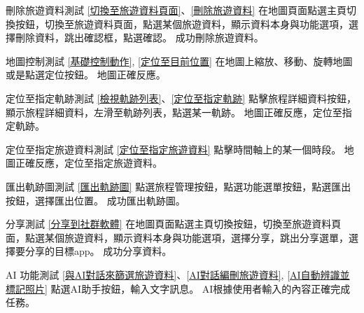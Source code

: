 \addtestcase
  {刪除旅遊資料測試}
  {}
  {\ref{切換至旅遊資料頁面}、\ref{刪除旅遊資料}}
  {在地圖頁面點選主頁切換按鈕，切換至旅遊資料頁面，點選某個旅遊資料，顯示資料本身與功能選項，選擇刪除資料，跳出確認框，點選確認。}
  {成功刪除旅遊資料。}

\addtestcase
  {地圖控制測試}
  {}
  {\ref{基礎控制動作}, \ref{定位至目前位置}}
  {在地圖上縮放、移動、旋轉地圖或是點選定位按鈕。}
  {地圖正確反應。}

\addtestcase
  {定位至指定軌跡測試}
  {}
  {\ref{檢視軌跡列表}、\ref{定位至指定軌跡}}
  {點擊旅程詳細資料按鈕，顯示旅程詳細資料，左滑至軌跡列表，點選某一軌跡。}
  {地圖正確反應，定位至指定軌跡。}

\addtestcase
  {定位至指定旅遊資料測試}
  {}
  {\ref{定位至指定旅遊資料}}
  {點擊時間軸上的某一個時段。}
  {地圖正確反應，定位至指定旅遊資料。}

\addtestcase
  {匯出軌跡圖測試}
  {}
  {\ref{匯出軌跡圖}}
  {點選旅程管理按鈕，點選功能選單按鈕，點選匯出按鈕，選擇匯出位置。}
  {成功匯出軌跡圖。}

\addtestcase
  {分享測試}
  {}
  {\ref{分享到社群軟體}}
  {在地圖頁面點選主頁切換按鈕，切換至旅遊資料頁面，點選某個旅遊資料，顯示資料本身與功能選項，選擇分享，跳出分享選單，選擇要分享的目標app。}
  {成功分享資料。}

\addtestcase
  {AI 功能測試}
  {}
  {\ref{與AI對話來篩選旅遊資料}、\ref{AI對話編刪旅遊資料}, \ref{AI自動辨識並標記照片}}
  {點選AI助手按鈕，輸入文字訊息。}
  {AI根據使用者輸入的內容正確完成任務。}

\testcaseTable
